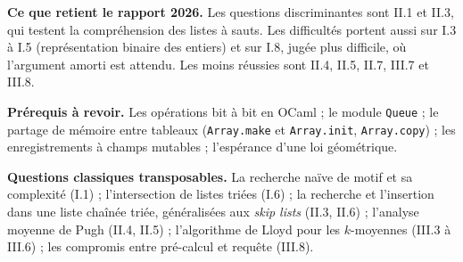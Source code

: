 \documentclass[11pt,a4paper]{article}
\begin{document}
\textbf{Ce que retient le rapport 2026.} Les questions discriminantes sont II.1 et II.3, qui testent la compréhension des listes à sauts. Les difficultés portent aussi sur I.3 à I.5 (représentation binaire des entiers) et sur I.8, jugée plus difficile, où l'argument amorti est attendu. Les moins réussies sont II.4, II.5, II.7, III.7 et III.8.

\textbf{Prérequis à revoir.} Les opérations bit à bit en OCaml ; le module \texttt{Queue} ; le partage de mémoire entre tableaux (\texttt{Array.make} et \texttt{Array.init}, \texttt{Array.copy}) ; les enregistrements à champs mutables ; l'espérance d'une loi géométrique.

\textbf{Questions classiques transposables.} La recherche naïve de motif et sa complexité (I.1) ; l'intersection de listes triées (I.6) ; la recherche et l'insertion dans une liste chaînée triée, généralisées aux \emph{skip lists} (II.3, II.6) ; l'analyse moyenne de Pugh (II.4, II.5) ; l'algorithme de Lloyd pour les \(k\)-moyennes (III.3 à III.6) ; les compromis entre pré-calcul et requête (III.8).
\end{document}
